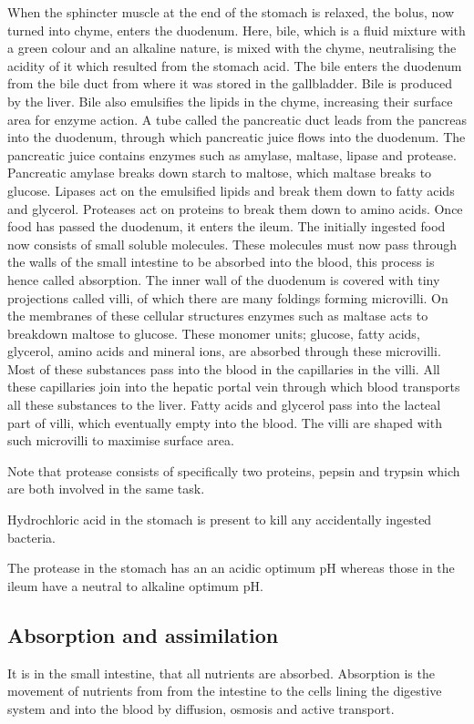 When the sphincter muscle at the end of the stomach is relaxed, the bolus, now turned into chyme,
enters the duodenum. Here, bile, which is a fluid mixture with a green colour and an alkaline
nature, is mixed with the chyme, neutralising the acidity of it which resulted from the stomach
acid. The bile enters the duodenum from the bile duct from where it was stored in the gallbladder.
Bile is produced by the liver. Bile also emulsifies the lipids in the chyme, increasing their
surface area for enzyme action. A tube called the pancreatic duct leads from the pancreas into the
duodenum, through which pancreatic juice flows into the duodenum. The pancreatic juice contains
enzymes such as amylase, maltase, lipase and protease. Pancreatic amylase breaks down starch to
maltose, which maltase breaks to glucose. Lipases act on the emulsified lipids and break them down
to fatty acids and glycerol. Proteases act on proteins to break them down to amino acids. Once
food has passed the duodenum, it enters the ileum. The initially ingested food now consists of 
small soluble molecules. These molecules must now pass through the walls of the small intestine
to be absorbed into the blood, this process is hence called absorption. The inner wall of the
duodenum is covered with tiny projections called villi, of which there are many foldings forming
microvilli. On the membranes of these cellular structures enzymes such as maltase acts to breakdown
maltose to glucose. These monomer units; glucose, fatty acids, glycerol, amino acids and mineral
ions, are absorbed through these microvilli. Most of these substances pass into the blood in the
capillaries in the villi. All these capillaries join into the hepatic portal vein through which
blood transports all these substances to the liver. Fatty acids and glycerol pass into the lacteal
part of villi, which eventually empty into the blood. The villi are shaped with such microvilli
to maximise surface area.

Note that protease consists of specifically two proteins, pepsin and trypsin which are both 
involved in the same task.

Hydrochloric acid in the stomach is present to kill any accidentally ingested bacteria.

The protease in the stomach has an an acidic optimum pH whereas those in the ileum have a neutral
to alkaline optimum pH.

\subsection{Absorption and assimilation}
It is in the small intestine, that all nutrients are absorbed. Absorption is the movement of 
nutrients from from the intestine to the cells lining the digestive system and into the blood by
diffusion, osmosis and active transport.

